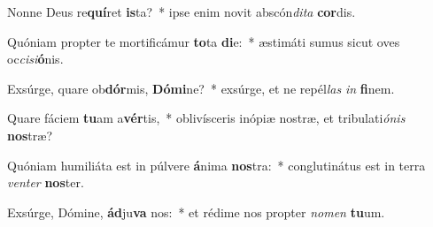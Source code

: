\item Nonne Deus re\textbf{quí}ret \textbf{is}ta?~* ipse enim novit abscón\textit{di}\textit{ta} \textbf{cor}dis.
\item Quóniam propter te mortificámur \textbf{to}ta \textbf{di}e:~* æstimáti sumus sicut oves oc\textit{ci}\textit{si}\textbf{ó}nis.
\item Exsúrge, quare ob\textbf{dór}mis, \textbf{Dó}\textbf{mi}ne?~* exsúrge, et ne repél\textit{las} \textit{in} \textbf{fi}nem.
\item Quare fáciem \textbf{tu}am a\textbf{vér}tis,~* oblivísceris inópiæ nostræ, et tribulati\textit{ó}\textit{nis} \textbf{nos}træ?
\item Quóniam humiliáta est in púlvere \textbf{á}nima \textbf{nos}tra:~* conglutinátus est in terra \textit{ven}\textit{ter} \textbf{nos}ter.
\item Exsúrge, Dómine, \textbf{ád}ju\textbf{va} nos:~* et rédime nos propter \textit{no}\textit{men} \textbf{tu}um.
